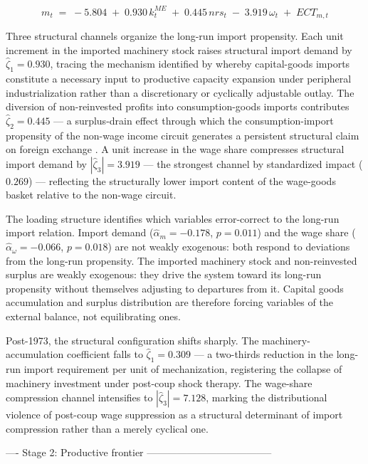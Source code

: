 \documentclass[11pt,a4paper]{article}
\begin{document}
{\begin{equation}
    m_t \;=\; -5.804 \;+\; 0.930\,k_t^{ME}
              \;+\; 0.445\,nrs_t
              \;-\; 3.919\,\omega_t
              \;+\; ECT_{m,t}
    \label{eq:cl:import_cv}
\end{equation}

Three structural channels organize the long-run import propensity. Each
unit increment in the imported machinery stock raises structural import
demand by $\hat{\zeta}_1 = 0.930$, tracing the mechanism identified by
\citet{Kaldor1959} whereby capital-goods imports constitute a necessary
input to productive capacity expansion under peripheral industrialization
rather than a discretionary or cyclically adjustable outlay. The
diversion of non-reinvested profits into consumption-goods imports
contributes $\hat{\zeta}_2 = 0.445$ --- a surplus-drain effect through
which the consumption-import propensity of the non-wage income circuit
generates a persistent structural claim on foreign exchange
\citep{Palma1989}. A unit increase in the wage share compresses
structural import demand by $|\hat{\zeta}_3| = 3.919$ --- the strongest
channel by standardized impact ($0.269$) --- reflecting the structurally
lower import content of the wage-goods basket relative to the non-wage
circuit.

The loading structure identifies which variables error-correct to the
long-run import relation. Import demand ($\hat{\alpha}_m = -0.178$,
$p = 0.011$) and the wage share ($\hat{\alpha}_\omega = -0.066$,
$p = 0.018$) are not weakly exogenous: both respond to deviations from
the long-run propensity. The imported machinery stock and non-reinvested
surplus are weakly exogenous: they drive the system toward its long-run
propensity without themselves adjusting to departures from it. Capital
goods accumulation and surplus distribution are therefore forcing
variables of the external balance, not equilibrating ones.

Post-1973, the structural configuration shifts sharply. The
machinery-accumulation coefficient falls to $\hat{\zeta}_1 = 0.309$
--- a two-thirds reduction in the long-run import requirement per unit
of mechanization, registering the collapse of machinery investment
under post-coup shock therapy. The wage-share compression channel
intensifies to $|\hat{\zeta}_3| = 7.128$, marking the distributional
violence of post-coup wage suppression as a structural determinant of
import compression rather than a merely cyclical one.

 ---- Stage 2: Productive frontier --------------------------------------

}
\end{document}

